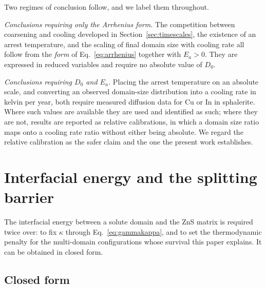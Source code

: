 \documentclass[preprint,12pt,authoryear]{elsarticle}
\begin{document}
Two regimes of conclusion follow, and we label them throughout.

\emph{Conclusions requiring only the Arrhenius form.} The competition between
coarsening and cooling developed in Section~\ref{sec:timescales}, the existence
of an arrest temperature, and the scaling of final domain size with cooling rate
all follow from the \emph{form} of Eq.~\eqref{eq:arrhenius} together with
$E_a > 0$. They are expressed in reduced variables and require no absolute
value of $D_0$.

\emph{Conclusions requiring $D_0$ and $E_a$.} Placing the arrest temperature on
an absolute scale, and converting an observed domain-size distribution into a
cooling rate in kelvin per year, both require measured diffusion data for Cu or
In in sphalerite. Where such values are available they are used and identified
as such; where they are not, results are reported as relative calibrations, in
which a domain size ratio maps onto a cooling rate ratio without either being
absolute. We regard the relative calibration as the safer claim and the one the
present work establishes.

\section{Interfacial energy and the splitting barrier}
\label{sec:gamma}

The interfacial energy between a solute domain and the ZnS matrix is required
twice over: to fix $\kappa$ through Eq.~\eqref{eq:gammakappa}, and to set the
thermodynamic penalty for the multi-domain configurations whose survival this
paper explains. It can be obtained in closed form.

\subsection{Closed form}
\label{sec:gammaclosed}
\end{document}
